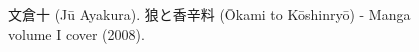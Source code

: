 \documentclass[letterpaper, 16pt]{article}
\begin{document}
\begin{CJK}{UTF8}{min}
\begin{figure}[H]
    \centering
    \caption*{文倉十 (Jū Ayakura). 狼と香辛料 (Ōkami to Kōshinryō) - Manga volume I cover (2008).}
    \label{fig:holo}
\end{figure}
\end{CJK}
\end{document}
